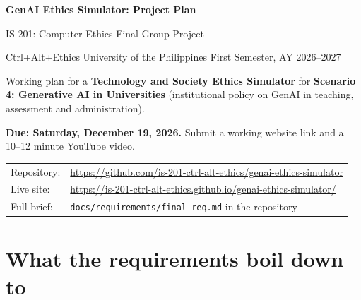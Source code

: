 \documentclass[11pt,a4paper]{article}
\newcommand{\code}[1]{\texttt{#1}}
\newcommand{\repo}{https://github.com/is-201-ctrl-alt-ethics/genai-ethics-simulator}
\begin{document}
\begin{center}
  {\LARGE\bfseries\color{accent} GenAI Ethics Simulator: Project Plan}\par\vspace{4pt}
  {\large IS 201: Computer Ethics \textperiodcentered{} Final Group Project}\par\vspace{2pt}
  Ctrl+Alt+Ethics \textperiodcentered{} University of the Philippines \textperiodcentered{} First Semester, AY 2026--2027
\end{center}

\begin{tcolorbox}[colback=accent!6,colframe=accent,boxrule=0.6pt,arc=2pt]
Working plan for a \textbf{Technology and Society Ethics Simulator} for
\textbf{Scenario 4: Generative AI in Universities} (institutional policy on GenAI in teaching,
assessment and administration).

\textbf{Due: Saturday, December 19, 2026.} Submit a working website link and a 10--12 minute YouTube video.

\begin{tabular}{@{}ll@{}}
Repository: & \url{\repo} \\
Live site:  & \url{https://is-201-ctrl-alt-ethics.github.io/genai-ethics-simulator/} \\
Full brief: & \code{docs/requirements/final-req.md} in the repository \\
\end{tabular}
\end{tcolorbox}

\section{What the requirements boil down to}
\end{document}
